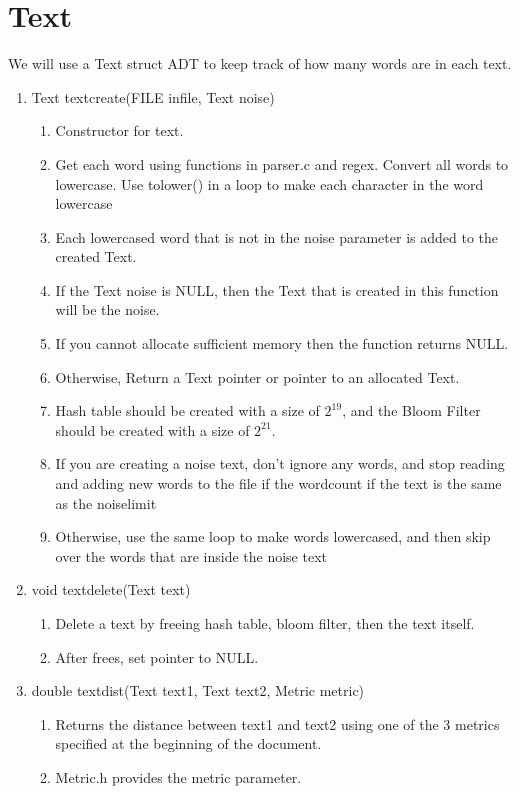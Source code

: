 \documentclass[11pt]{article}
\begin{document}
\section{Text}\label{ss:text}
We will use a Text struct ADT to keep track of how many words are in each text.
\begin{enumerate}
\item Text textcreate(FILE infile, Text noise)
	\begin{enumerate}
	\item Constructor for text.
	\item Get each word using functions in parser.c and regex. Convert all words to lowercase. Use tolower() in a loop to make each character in the word lowercase
	\item Each lowercased word that is not in the noise parameter is added to the created Text.
	\item If the Text noise is NULL, then the Text that is created in this function will be the noise.
	\item If you cannot allocate sufficient memory then the function returns NULL.
	\item Otherwise, Return a Text pointer or pointer to an allocated Text.
	\item Hash table should be created with a size of \(2^{19}\), and the Bloom Filter should be created with a size of \(2^{21}\).
	\item If you are creating a noise text, don't ignore any words, and stop reading and adding new words to the file if the wordcount if the text is the same as the noiselimit
	\item Otherwise, use the same loop to make words lowercased, and then skip over the words that are inside the noise text
	\end{enumerate}
\item void textdelete(Text text)
	\begin{enumerate}
	\item Delete a text by freeing hash table, bloom filter, then the text itself.
	\item After frees, set pointer to NULL.
	\end{enumerate}
\item double textdist(Text text1, Text text2, Metric metric)
	\begin{enumerate}
	\item Returns the distance between text1 and text2 using one of the 3 metrics specified at the beginning of the document.
	\item Metric.h provides the metric parameter.

\end{enumerate}
\end{enumerate}
\end{document}
